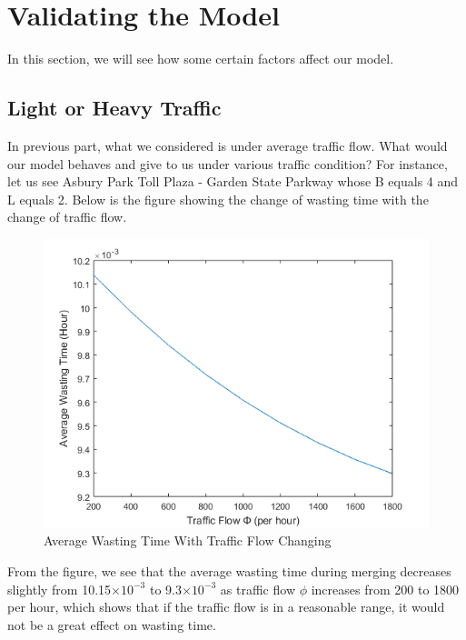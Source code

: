 \section{Validating the Model}
In this section, we will see how some certain factors affect our model.

\subsection{Light or Heavy Traffic}
In previous part, what we considered is under average traffic flow. What would our model behaves and give to us under various traffic condition? For instance, let us see Asbury Park Toll Plaza - Garden State Parkway whose B equals 4 and L equals 2. Below is the figure showing the change of wasting time with the change of traffic flow.\\

\begin{figure}[h]
\small
\centering
\includegraphics[width=12cm]{phi.png}
\caption{Average Wasting Time With Traffic Flow Changing} \label{fig: Average Wasting Time With Traffic Flow Changing}
\end{figure}
\noindent
From the figure, we see that the average wasting time during merging decreases slightly from 10.15$\times 10^{-3}$ to 9.3$\times 10^{-3}$ as traffic flow $\phi$ increases from 200 to 1800 per hour, which shows that if the traffic flow is in a reasonable range, it would not be a great effect on wasting time.


